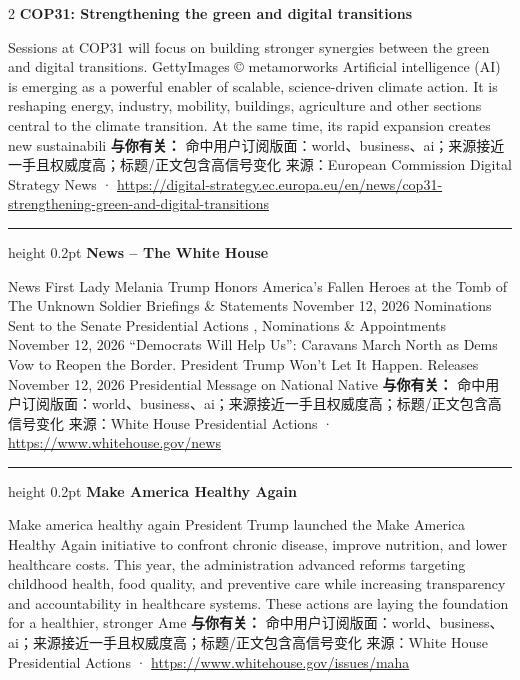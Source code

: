 \documentclass[10.5pt]{ctexart}
\begin{document}
\begin{multicols}{2}
{\large\bfseries COP31: Strengthening the green and digital transitions}\par
Sessions at COP31 will focus on building stronger synergies between the green and digital transitions. GettyImages © metamorworks Artificial intelligence (AI) is emerging as a powerful enabler of scalable, science-driven climate action. It is reshaping energy, industry, mobility, buildings, agriculture and other sections central to the climate transition. At the same time, its rapid expansion creates new sustainabili
\textbf{与你有关：} 命中用户订阅版面：world、business、ai；来源接近一手且权威度高；标题/正文包含高信号变化
{\footnotesize\color{ormuted} 来源：European Commission Digital Strategy News · \url{https://digital-strategy.ec.europa.eu/en/news/cop31-strengthening-green-and-digital-transitions}}
\vspace{2mm}
\hrule height 0.2pt
\vspace{2mm}
{\large\bfseries News – The White House}\par
News First Lady Melania Trump Honors America’s Fallen Heroes at the Tomb of The Unknown Soldier Briefings \& Statements November 12, 2026 Nominations Sent to the Senate Presidential Actions , Nominations \& Appointments November 12, 2026 “Democrats Will Help Us”: Caravans March North as Dems Vow to Reopen the Border. President Trump Won’t Let It Happen. Releases November 12, 2026 Presidential Message on National Native
\textbf{与你有关：} 命中用户订阅版面：world、business、ai；来源接近一手且权威度高；标题/正文包含高信号变化
{\footnotesize\color{ormuted} 来源：White House Presidential Actions · \url{https://www.whitehouse.gov/news}}
\vspace{2mm}
\hrule height 0.2pt
\vspace{2mm}
{\large\bfseries Make America Healthy Again}\par
Make america healthy again President Trump launched the Make America Healthy Again initiative to confront chronic disease, improve nutrition, and lower healthcare costs. This year, the administration advanced reforms targeting childhood health, food quality, and preventive care while increasing transparency and accountability in healthcare systems. These actions are laying the foundation for a healthier, stronger Ame
\textbf{与你有关：} 命中用户订阅版面：world、business、ai；来源接近一手且权威度高；标题/正文包含高信号变化
{\footnotesize\color{ormuted} 来源：White House Presidential Actions · \url{https://www.whitehouse.gov/issues/maha}}

\end{multicols}
\end{document}

